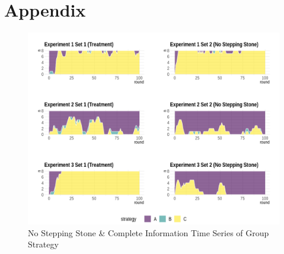 \appendix
\renewcommand\thefigure{\thechapter.\arabic{figure}}
\renewcommand\thetable{\thechapter.\arabic{table}}


\chapter{Appendix}

\begin{figure}[h]
\captionsetup{justification=centering}
  \caption{No Stepping Stone \& Complete Information Time Series of Group Strategy}
   \label{fig:Series1C}
    \includegraphics[width = \textwidth]{Images/AllAreaPlot1C.png}
    
\end{figure}

